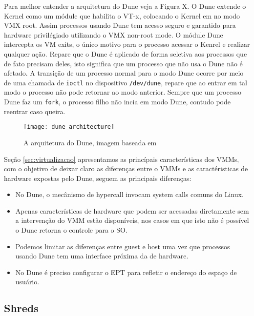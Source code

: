 Para melhor entender a arquitetura do Dune veja a Figura X. O Dune extende o
Kernel como um módule que habilita o VT-x, colocando o Kernel em no modo VMX
root. Assim processos usando Dune tem acesso seguro e garantido para hardware
privilégiado utilizando o VMX non-root mode. O módule Dune intercepta os VM
exits, o único motivo para o processo acessar o Kenrel e realizar qualquer
ação. Repare que o Dune é aplicado de forma seletiva aos processos que de fato
precisam deles, isto significa que um processo que não usa o Dune não é
afetado. A transição de um processo normal para o modo Dune ocorre por meio de
uma chamada de \texttt{ioctl} no dispositivo \texttt{/dev/dune}, repare que ao
entrar em tal modo o processo não pode retornar ao modo anterior. Sempre que um
processo Dune faz um \texttt{fork}, o processo filho não incia em modo Dune,
contudo pode reentrar caso queira.

\begin{figure}[!h]
  \centering
  \texttt{[image: dune\_architecture]} 
  \caption{A arquitetura do Dune, imagem baseada em \citep{belay}}
  \label{fig:resource_constainer_scenarios}
\end{figure}

Seção \ref{sec:virtualizacao} apresentamos as princípais características dos
VMMs, com o objetivo de deixar claro as diferenças entre o VMMs e as
caractéristicas de hardware expostas pelo Dune, seguem as principais
diferenças:


\begin{itemize}
  \item No Dune, o mecânismo de hypercall invocam system calls comuns do Linux.
  \item Apenas características de hardware que podem ser acessadas diretamente sem a intervenção do VMM estão disponíveis, nos casos em que isto não é possível o Dune retorna o controle para o SO.
  \item Podemos limitar as diferenças entre guest e host uma vez que processos usando Dune tem uma interface próxima da de hardware.
  \item No Dune é preciso configurar o EPT para refletir o endereço do espaço de usuário.
\end{itemize}

\subsection{Shreds}

